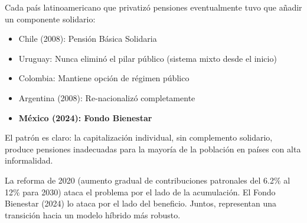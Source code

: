 \documentclass[11pt,a4paper]{report}
\begin{document}
\begin{tcolorbox}[colback=green!5!white, colframe=green!50!black, title=\textbf{Intuici\'on: M\'exico Aprendi\'o de sus Vecinos}]
Cada pa\'is latinoamericano que privatiz\'o pensiones eventualmente tuvo que a\~nadir un componente solidario:
\begin{itemize}
  \item Chile (2008): Pensi\'on B\'asica Solidaria
  \item Uruguay: Nunca elimin\'o el pilar p\'ublico (sistema mixto desde el inicio)
  \item Colombia: Mantiene opci\'on de r\'egimen p\'ublico
  \item Argentina (2008): Re-nacionaliz\'o completamente
  \item \textbf{M\'exico (2024): Fondo Bienestar}
\end{itemize}

El patr\'on es claro: la capitalizaci\'on individual, sin complemento solidario, produce pensiones inadecuadas para la mayor\'ia de la poblaci\'on en pa\'ises con alta informalidad.

La reforma de 2020 (aumento gradual de contribuciones patronales del 6.2\% al 12\% para 2030) ataca el problema por el lado de la acumulaci\'on. El Fondo Bienestar (2024) lo ataca por el lado del beneficio. Juntos, representan una transici\'on hacia un modelo h\'ibrido m\'as robusto.
\end{tcolorbox}
\end{document}
